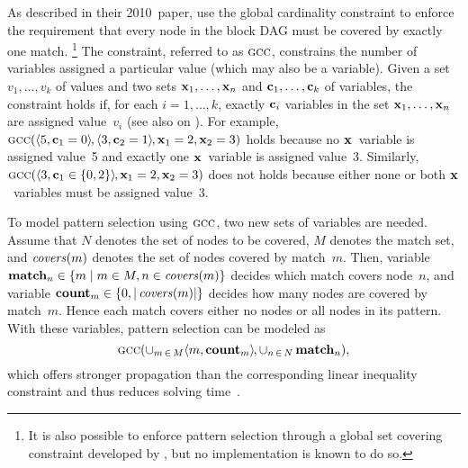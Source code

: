 As described in their 2010~paper, \citeauthor{FlochEtAl:2010} use the
\gls{global cardinality constraint} to enforce the requirement that every
\gls{node} in the \gls{block DAG} must be covered by exactly one
\gls{match}.\!%
%
\footnote{%
  It is also possible to enforce \gls{pattern selection} through a \gls{global
    set covering constraint} developed by \textcite{MouthuyEtAl:2007}, but
  no implementation is known to do so.%
}
%
The \gls{constraint}, referred to as $\mGCC$, constrains the number of
\glspl{variable} assigned a particular value (which may also be a
\gls{variable}).
%
Given a set \mbox{$v_1, \ldots, v_k$} of values and two sets \mbox{$\mVar{x}_1,
  \ldots, \mVar{x}_n$} and \mbox{$\mVar{c}_1, \ldots, \mVar{c}_k$} of
\glspl{variable}, the \gls{constraint} holds if, for each \mbox{$i = 1, \ldots,
  k$}, exactly $\mVar{c}_i$ \glspl{variable} in the set \mbox{$\mVar{x}_1,
  \ldots, \mVar{x}_n$} are assigned value~$v_i$ (see also  on
).
%
For example, \mbox{$\mGCC(\mTuple{5, \mVar{c}_1 = 0} \hspace{-1pt}, \mTuple{3,
    \mVar{c}_2 = 1} \hspace{-1pt}, \mVar{x}_1 = 2, \mVar{x}_2 =3)$} holds
because no $\mVar{x}$~\gls{variable} is assigned value~\num{5} and exactly one
$\mVar{x}$~\gls{variable} is assigned value~\num{3}.
%
Similarly, \mbox{$\mGCC(\mTuple{3, \mVar{c}_1 \in \mSet{0, 2}} \hspace{-1pt},
  \mVar{x}_1 = 2, \mVar{x}_2 = 3)$} does not holds because either none or both
$\mVar{x}$~\glspl{variable} must be assigned value~\num{3}.

To model \gls{pattern selection} using $\mGCC$, two new sets of \glspl{variable}
are needed.
%
Assume that $N$ denotes the set of \glspl{node} to be covered, $M$ denotes the
\gls{match set}, and $\operatorname{\textrm{\textit{covers}}}(m)$ denotes the set of \glspl{node} covered by
\gls{match}~$m$.
%
Then, \gls{variable} \mbox{$\mVar{match}_n \in \mSetBuilder{m}{m \in M, n \in
    \mCovers(m)}$} decides which \gls{match} covers \gls{node}~$n$, and
\gls{variable} \mbox{$\mVar{count}_m \in \mSet{0, |\mCovers(m)|}$} decides how
many \glspl{node} are covered by \gls{match}~$m$.
%
Hence each match covers either no \glspl{node} or all \glspl{node} in its
\gls{pattern}.
%
With these \glspl{variable}, \gls{pattern selection} can be modeled as
%
\begin{displaymath}
  \mGCC(
    \cup_{m \,\in\, M} \mTuple{m, \mVar{count}_m} \hspace{-1pt},
    \cup_{n \,\in\, N} \, \mVar{match}_n
  ),
\end{displaymath}
%
which offers stronger \gls{propagation} than the corresponding linear inequality
constraint and thus reduces solving time~\cite{FlochEtAl:2010}.

